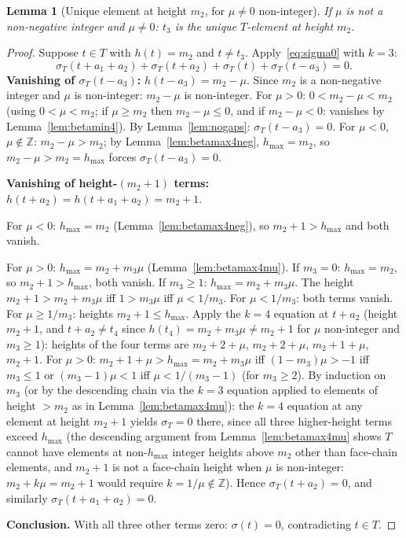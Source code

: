 \documentclass{article}
\newtheorem{lemma}{Lemma}
\begin{document}
\begin{lemma}[Unique element at height $m_2$, for $\mu\ne 0$ non-integer]\label{lem:top}
If $\mu$ is not a non-negative integer and $\mu\ne 0$\textup{:}
$t_3$ is the unique $T$-element at height $m_2$.
\end{lemma}
\begin{proof}
Suppose $t\in T$ with $h(t)=m_2$ and $t\ne t_3$.
Apply~\eqref{eq:sigma0} with $k=3$:
\[
  \sigma_T(t+a_1+a_2)+\sigma_T(t+a_2)+\sigma_T(t)+\sigma_T(t-a_3)=0.
\]
\textbf{Vanishing of $\sigma_T(t-a_3)$:}
$h(t-a_3)=m_2-\mu$.  Since $m_2$ is a non-negative integer and $\mu$ is non-integer:
$m_2-\mu$ is non-integer.  For $\mu>0$: $0<m_2-\mu<m_2$ (using $0<\mu<m_2$; if $\mu\ge m_2$
then $m_2-\mu\le 0$, and if $m_2-\mu<0$: vanishes by Lemma~\ref{lem:betamin4}).
By Lemma~\ref{lem:nogaps}: $\sigma_T(t-a_3)=0$.
For $\mu<0$, $\mu\notin\mathbb{Z}$: $m_2-\mu>m_2$; by Lemma~\ref{lem:betamax4neg}, $h_{\max}=m_2$,
so $m_2-\mu>m_2=h_{\max}$ forces $\sigma_T(t-a_3)=0$.

\textbf{Vanishing of height-$(m_2+1)$ terms:}
$h(t+a_2)=h(t+a_1+a_2)=m_2+1$.

For $\mu<0$: $h_{\max}=m_2$ (Lemma~\ref{lem:betamax4neg}), so $m_2+1>h_{\max}$
and both vanish.

For $\mu>0$: $h_{\max}=m_2+m_3\mu$ (Lemma~\ref{lem:betamax4mu}).
If $m_3=0$: $h_{\max}=m_2$, so $m_2+1>h_{\max}$, both vanish.
If $m_3\ge 1$: $h_{\max}=m_2+m_3\mu$.  The height $m_2+1>m_2+m_3\mu$ iff $1>m_3\mu$ iff $\mu<1/m_3$.
For $\mu<1/m_3$: both terms vanish.
For $\mu\ge 1/m_3$: heights $m_2+1\le h_{\max}$.
Apply the $k=4$ equation at $t+a_2$ (height $m_2+1$, and $t+a_2\ne t_4$ since $h(t_4)=m_2+m_3\mu\ne m_2+1$ for $\mu$ non-integer and $m_3\ge 1$):
heights of the four terms are $m_2+2+\mu$, $m_2+2+\mu$, $m_2+1+\mu$, $m_2+1$.
For $\mu>0$: $m_2+1+\mu>h_{\max}=m_2+m_3\mu$ iff $(1-m_3)\mu>-1$ iff $m_3\le 1$ or
$(m_3-1)\mu<1$ iff $\mu<1/(m_3-1)$ (for $m_3\ge 2$).
By induction on $m_3$ (or by the descending chain via the $k=3$ equation applied
to elements of height $>m_2$ as in Lemma~\ref{lem:betamax4mu}):
the $k=4$ equation at any element at height $m_2+1$ yields $\sigma_T=0$ there,
since all three higher-height terms exceed $h_{\max}$ (the descending argument from
Lemma~\ref{lem:betamax4mu} shows $T$ cannot have elements at non-$h_{\max}$ integer
heights above $m_2$ other than face-chain elements, and $m_2+1$ is not a face-chain height
when $\mu$ is non-integer: $m_2+k\mu=m_2+1$ would require $k=1/\mu\notin\mathbb{Z}$).
Hence $\sigma_T(t+a_2)=0$, and similarly $\sigma_T(t+a_1+a_2)=0$.

\textbf{Conclusion.}
With all three other terms zero: $\sigma(t)=0$, contradicting $t\in T$.
\end{proof}
\end{document}
